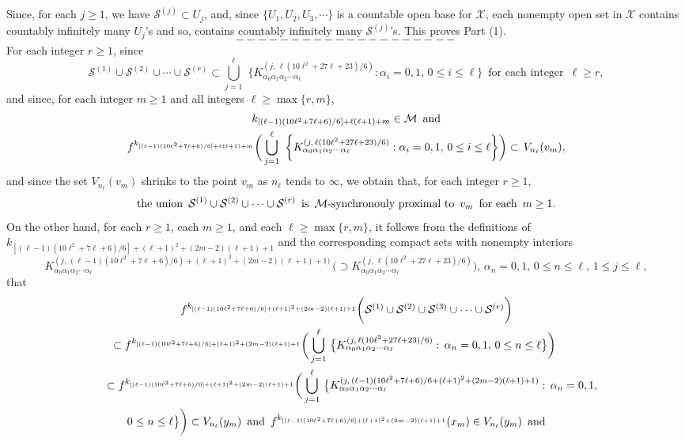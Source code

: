 \documentclass[12pt]{article}
\newcommand{\al}{\alpha}
\begin{document}
Since, for each $j \ge 1$, we have $\mathcal S^{(j)} \subset U_j$, and, since $\{ U_1, U_2, U_3, \cdots \}$ is a countable open base for $\mathcal X$, each nonempty open set in $\mathcal X$ contains countably infinitely many $U_j$'s and so, contains countably infinitely many $\mathcal S^{(j)}$'s.  This proves Part (1).  
$$--------------------$$
\indent For each integer $r \ge 1$, since 
$$
\mathcal S^{(1)} \cup \mathcal S^{(2)} \cup \cdots \cup \mathcal S^{(r)} \subset \bigcup_{j=1}^\ell \,\, \bigg\{ K_{\al_0\al_1\al_2\cdots\al_\ell}^{(j, \, \ell(10\ell^2+27\ell+23)/6)}: \al_i = 0, 1, \, 0 \le i \le \ell \bigg\} \,\,\, \text{for each integer} \,\,\, \ell \ge r,
$$
and since, for each integer $m \ge 1$ and all integers $\ell \ge \max \{ r, m \}$,   
\begin{multline*}
$$
k_{[(\ell-1)(10\ell^2+7\ell+6)/6]+\ell(\ell+1)+m} \in \mathcal M \,\,\, \text{and} \\
f^{k_{[(\ell-1)(10\ell^2+7\ell+6)/6]+\ell(\ell+1)+m}}\bigg(\bigcup_{j=1}^\ell \,\, \bigg\{K_{\al_0\al_1\al_2\cdots\al_\ell}^{(j, \, \ell(10\ell^2+27\ell+23)/6)}:  \al_i = 0, 1, \, 0 \le i \le \ell \bigg\}\bigg) \subset \, V_{n_\ell}(v_m),
$$
\end{multline*}
and since the set $V_{n_\ell}(v_m)$ shrinks to the point $v_m$ as $n_\ell$ tends to $\infty$, we obtain that, for each integer $r \ge 1$, 
$$
\text{the union} \,\,\, \mathcal S^{(1)} \cup \mathcal S^{(2)} \cup \cdots \cup \mathcal S^{(r)} \,\,\, \text{is} \,\,\, \mathcal M\text{-synchronouly proximal to} \,\,\, v_m \,\,\, \text{for each} \,\,\, m \ge 1. \vspace{.15in}
$$
\indent On the other hand, for each $r \ge 1$, each $m \ge 1$, and each $\ell \ge \max \{ r, m \}$, it follows from the definitions of 
$k_{[(\ell-1)(10\ell^2+7\ell+6)/6]+(\ell+1)^2+(2m-2)(\ell+1)+1}$ and the corresponding compact sets with nonempty interiors 
$$
K_{\al_0\al_1\al_2\cdots\al_\ell}^{(j, \, (\ell-1)(10\ell^2+7\ell+6)/6)+(\ell+1)^2+(2m-2)(\ell+1)+1)} \, \big(\supset K_{\al_0\al_1\al_2\cdots\al_\ell}^{(j, \, \ell(10\ell^2+27\ell+23)/6)}\big), \, \al_n = 0, 1, \, 0 \le n \le \ell, \, 1 \le j \le \ell, 
$$
that
\begin{multline*}
$$
f^{k_{[(\ell-1)(10\ell^2+7\ell+6)/6]+(\ell+1)^2+(2m-2)(\ell+1)+1}}\bigg(\mathcal S^{(1)} \cup \mathcal S^{(2)} \cup \mathcal S^{(3)} \cup \cdots \cup \mathcal S^{(r)}\bigg) \\
\subset f^{k_{[(\ell-1)(10\ell^2+7\ell+6)/6]+(\ell+1)^2+(2m-2)(\ell+1)+1}}\bigg(\bigcup_{j=1}^\ell \, \big\{ K_{\al_0\al_1\al_2\cdots\al_\ell}^{(j, \, \ell(10\ell^2+27\ell+23)/6)}: \, \al_n = 0, 1, \, 0 \le n \le \ell \big\}\bigg) \qquad\, \\ 
\,\,\,\,\,\, \subset f^{k_{[(\ell-1)(10\ell^2+7\ell+6)/6]+(\ell+1)^2+(2m-2)(\ell+1)+1}}\bigg(\bigcup_{j=1}^\ell \, \big\{ K_{\al_0\al_1\al_2\cdots\al_\ell}^{(j, \, (\ell-1)(10\ell^2+7\ell+6)/6+(\ell+1)^2+(2m-2)(\ell+1)+1)}: \, \al_n = 0, 1, \\
\qquad\, 0 \le n \le \ell \big\}\bigg) \subset V_{n_\ell}(y_m) \,\,\, \text{and} \,\,\, f^{k_{[(\ell-1)(10\ell^2+7\ell+6)/6]+(\ell+1)^2+(2m-2)(\ell+1)+1}}(x_m) \in V_{n_\ell}(y_m) \,\,\, \text{and} \qquad\quad\quad \\ 
$$
\end{multline*}
\end{document}
